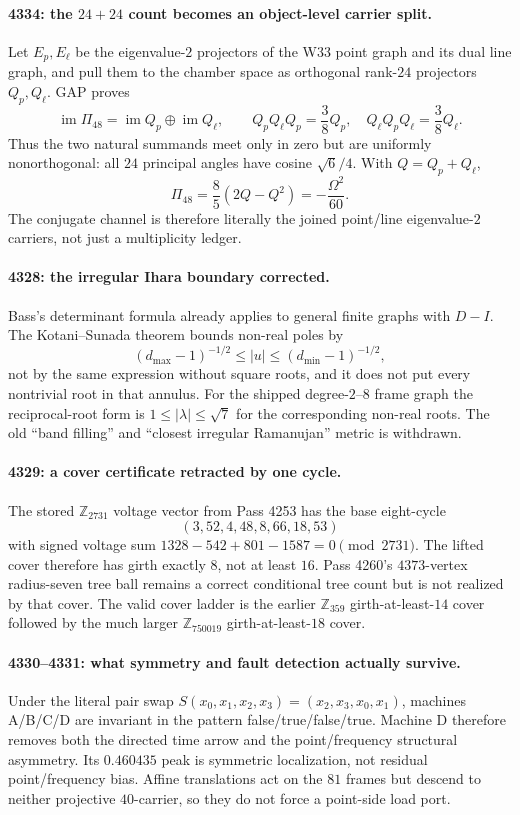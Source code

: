 \paragraph{4334: the $24+24$ count becomes an object-level carrier split.}
Let $E_p,E_\ell$ be the eigenvalue-$2$ projectors of the W33 point graph and its
dual line graph, and pull them to the chamber space as orthogonal rank-$24$ projectors
$Q_p,Q_\ell$.  GAP proves
\[
 \operatorname{im}\Pi_{48}
 =\operatorname{im}Q_p\oplus\operatorname{im}Q_\ell,\qquad
 Q_pQ_\ell Q_p=\frac38Q_p,\quad
 Q_\ell Q_pQ_\ell=\frac38Q_\ell.
\]
Thus the two natural summands meet only in zero but are uniformly nonorthogonal: all
$24$ principal angles have cosine $\sqrt6/4$.  With $Q=Q_p+Q_\ell$,
\[
 \Pi_{48}=\frac85(2Q-Q^2)=-\frac{\Omega^2}{60}.
\]
The conjugate channel is therefore literally the joined point/line eigenvalue-$2$
carriers, not just a multiplicity ledger.

\paragraph{4328: the irregular Ihara boundary corrected.}
Bass's determinant formula already applies to general finite graphs with $D-I$.  The
Kotani--Sunada theorem bounds non-real poles by
\[
 (d_{\max}-1)^{-1/2}\le |u|\le(d_{\min}-1)^{-1/2},
\]
not by the same expression without square roots, and it does not put every nontrivial
root in that annulus.  For the shipped degree-$2$--$8$ frame graph the reciprocal-root
form is $1\le|\lambda|\le\sqrt7$ for the corresponding non-real roots.  The old
``band filling'' and ``closest irregular Ramanujan'' metric is withdrawn.

\paragraph{4329: a cover certificate retracted by one cycle.}
The stored $\mathbb Z_{2731}$ voltage vector from Pass 4253 has the base eight-cycle
\[
 (3,52,4,48,8,66,18,53)
\]
with signed voltage sum $1328-542+801-1587=0\pmod{2731}$.  The lifted cover therefore
has girth exactly $8$, not at least $16$.  Pass 4260's $4373$-vertex radius-seven tree
ball remains a correct conditional tree count but is not realized by that cover.  The
valid cover ladder is the earlier $\mathbb Z_{359}$ girth-at-least-$14$ cover followed by
the much larger $\mathbb Z_{750019}$ girth-at-least-$18$ cover.

\paragraph{4330--4331: what symmetry and fault detection actually survive.}
Under the literal pair swap
$S(x_0,x_1,x_2,x_3)=(x_2,x_3,x_0,x_1)$, machines A/B/C/D are invariant in the pattern
false/true/false/true.  Machine D therefore removes both the directed time arrow and the
point/frequency structural asymmetry.  Its $0.460435$ peak is symmetric localization,
not residual point/frequency bias.  Affine translations act on the $81$ frames but
descend to neither projective $40$-carrier, so they do not force a point-side load port.

